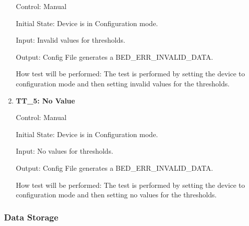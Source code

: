 \documentclass[12pt, titlepage]{article}
\begin{document}
\begin{enumerate}
		Control: Manual 
							
		Initial State: Device is in Configuration mode.
							
		Input: Invalid values for thresholds.
		
		Output: Config File generates a BED\_ERR\_INVALID\_DATA.
		
		How test will be performed: The test is performed by setting the device to configuration mode and then setting invalid values for the thresholds.

	\item{\textbf{TT\_5: No Value} \\}\label{TT5}
	
		Control: Manual 
							
		Initial State: Device is in Configuration mode.
							
		Input: No values for thresholds.
		
		Output: Config File generates a BED\_ERR\_INVALID\_DATA.

		How test will be performed: The test is performed by setting the device to configuration mode and then setting no values for the thresholds.
\end{enumerate}

\subsubsection{Data Storage}
\end{document}
